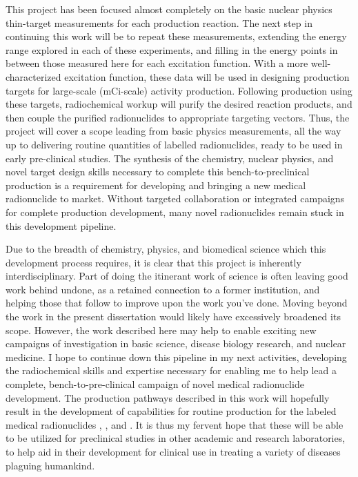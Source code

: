This project has been focused almost completely on  the basic nuclear physics thin-target measurements for each production reaction.
The next step in continuing this work will be to repeat these measurements, extending the energy range explored in each of these experiments, and filling in the energy points in between those measured here for each excitation function. 
With a more well-characterized excitation function, these data  will be used in designing production targets for large-scale (mCi-scale) activity production. 
Following production using these targets, radiochemical workup will purify the desired reaction products, and then couple the purified radionuclides to appropriate targeting vectors. 
Thus, the project will cover a scope leading from basic physics measurements, all the way up to delivering routine quantities of labelled radionuclides, ready to be used in early pre-clinical studies. 
The synthesis of the chemistry, nuclear physics, and novel target design skills necessary to complete this bench-to-preclinical production is a requirement for developing and bringing a new medical radionuclide to market.
Without targeted collaboration or integrated campaigns for complete production development, many novel radionuclides remain stuck in this development pipeline.



Due to the breadth of chemistry, physics, and biomedical science which this development process requires, it is clear that this project is inherently interdisciplinary.
Part of doing the itinerant work of science is often leaving good work behind undone, as a retained connection to a former institution, and helping those that follow  to improve upon the work you've done. 
Moving beyond the  work in the present dissertation would likely have excessively broadened its scope.
However, the work described here may help to enable exciting new campaigns of investigation in basic science, disease biology research, and nuclear medicine.
I hope to continue down this pipeline in my next activities, developing the radiochemical skills and expertise necessary for enabling me to help lead a complete, bench-to-pre-clinical campaign of novel medical radionuclide development.
The production pathways described in this work  will hopefully result in the development of capabilities for routine production for the labeled medical radionuclides  ,   , and . 
It is thus my fervent hope that these will be able to be utilized for preclinical studies in other  academic and research laboratories, to help aid in their development for clinical use in treating a variety of diseases plaguing humankind. 


